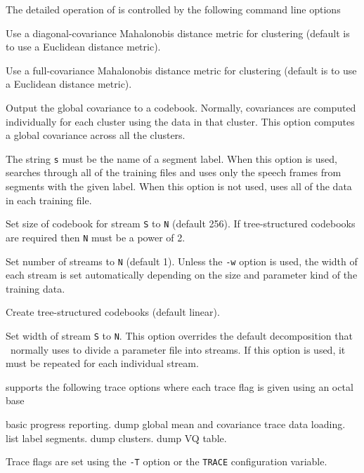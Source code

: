 The detailed operation of  is controlled by the following
command line options
\begin{optlist}
    Use a diagonal-covariance Mahalonobis distance metric for
 clustering (default is to use a Euclidean distance metric).

    Use a full-covariance Mahalonobis distance metric for
 clustering (default is to use a Euclidean distance metric).

    Output the global covariance to a codebook.  Normally,
     covariances are computed individually for each cluster using
     the data in that cluster.  This option computes a global covariance
     across all the clusters.

   The string {\tt s} must be the name of a
      segment label.  When this option is used,  searches
      through all of the training files and uses only the speech
      frames from segments with the given label.  When this option is not 
      used,  uses all of the data in each training file.

   Set size of codebook for stream \texttt{S} 
       to \texttt{N} (default 256).
   If tree-structured codebooks are required then \texttt{N} 
   must be a power of 2.
  
   Set number of streams to \texttt{N} (default 1).
    Unless the \texttt{-w} option is used, the width of each stream
    is set automatically depending on the size and parameter kind of the 
    training data.

    Create tree-structured codebooks (default linear).
  
   Set width of stream \texttt{S} to \texttt{N}.
  This option overrides the default decomposition that \HTK\ normally
  uses to divide a parameter file into streams.  If this option is used,
  it must be repeated for each individual stream.
  
\stdoptF
\stdoptG
\stdoptI
\stdoptL
\stdoptX
\end{optlist}

 supports the following trace options where each
trace flag is given using an octal base
\begin{optlist}
    basic progress reporting.
    dump global mean and covariance
    trace data loading.
    list label segments.
    dump clusters.
    dump VQ table.
\end{optlist}
Trace flags are set using the \texttt{-T} option or the  \texttt{TRACE} 
configuration variable.



